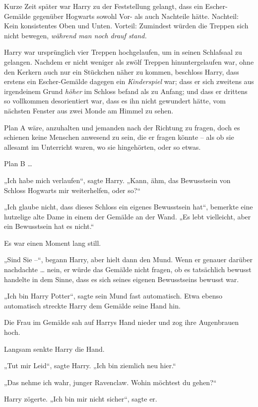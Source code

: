 Kurze Zeit später war Harry zu der Feststellung gelangt, dass ein Escher-Gemälde gegenüber Hogwarts sowohl Vor- als auch Nachteile hätte. Nachteil: Kein konsistentes Oben und Unten. Vorteil: Zumindest würden die Treppen sich nicht bewegen, \emph{während man noch drauf stand.} 

Harry war ursprünglich vier Treppen hochgelaufen, um in seinen Schlafsaal zu gelangen. Nachdem er nicht weniger als zwölf Treppen hinuntergelaufen war, ohne den Kerkern auch nur ein Stückchen näher zu kommen, beschloss Harry, dass erstens ein Escher-Gemälde dagegen ein \emph{Kinderspiel} war; dass er sich zweitens aus irgendeinem Grund \emph{höher} im Schloss befand als zu Anfang; und dass er drittens so vollkommen desorientiert war, dass es ihn nicht gewundert hätte, vom nächsten Fenster aus zwei Monde am Himmel zu sehen. 

Plan A wäre, anzuhalten und jemanden nach der Richtung zu fragen, doch es schienen keine Menschen anwesend zu sein, die er fragen könnte – als ob sie allesamt im Unterricht waren, wo sie hingehörten, oder so etwas. 

Plan B … 

„Ich habe mich verlaufen“, sagte Harry. „Kann, ähm, das Bewusstsein von Schloss Hogwarts mir weiterhelfen, oder so?“ 

„Ich glaube nicht, dass dieses Schloss ein eigenes Bewusstsein hat“, bemerkte eine hutzelige alte Dame in einem der Gemälde an der Wand. „Es lebt vielleicht, aber ein Bewusstsein hat es nicht.“ 

Es war einen Moment lang still. 

„Sind Sie –“, begann Harry, aber hielt dann den Mund. Wenn er genauer darüber nachdachte … nein, er würde das Gemälde nicht fragen, ob es tatsächlich bewusst handelte in dem Sinne, dass es sich seines eigenen Bewusstseins bewusst war. 

„Ich bin Harry Potter“, sagte sein Mund fast automatisch. Etwa ebenso automatisch streckte Harry dem Gemälde seine Hand hin. 

Die Frau im Gemälde sah auf Harrys Hand nieder und zog ihre Augenbrauen hoch. 

Langsam senkte Harry die Hand. 

„Tut mir Leid“, sagte Harry. „Ich bin ziemlich neu hier.“ 

„Das nehme ich wahr, junger Ravenclaw. Wohin möchtest du gehen?“ 

Harry zögerte. „Ich bin mir nicht sicher“, sagte er. 

